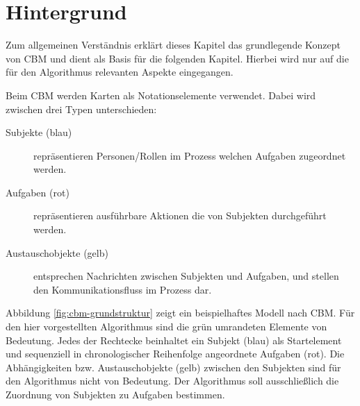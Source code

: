 %
%
% 
% 
% 

\chapter{Hintergrund} %
\label{cha:hintergrund}
Zum allgemeinen Verständnis erklärt dieses Kapitel das grundlegende Konzept von CBM und dient als Basis für die folgenden Kapitel. Hierbei wird nur auf die für den Algorithmus relevanten Aspekte eingegangen. 

Beim CBM werden Karten als Notationselemente verwendet. Dabei wird zwischen drei Typen unterschieden:
\begin{description}
	\item[Subjekte (blau)] repräsentieren Personen/Rollen im Prozess welchen Aufgaben zugeordnet werden.
	\item[Aufgaben (rot)] repräsentieren ausführbare Aktionen die von Subjekten durchgeführt werden.
	\item[Austauschobjekte (gelb)] entsprechen Nachrichten zwischen Subjekten und Aufgaben, und stellen den Kommunikationsfluss im Prozess dar.
\end{description}

Abbildung \ref{fig:cbm-grundstruktur} zeigt ein beispielhaftes Modell nach CBM. Für den hier vorgestellten Algorithmus sind die grün umrandeten Elemente von Bedeutung. Jedes der Rechtecke beinhaltet ein Subjekt (blau) als Startelement und sequenziell in chronologischer Reihenfolge angeordnete Aufgaben (rot). Die Abhängigkeiten bzw. Austauschobjekte (gelb) zwischen den Subjekten sind für den Algorithmus nicht von Bedeutung. Der Algorithmus soll ausschließlich die Zuordnung von Subjekten zu Aufgaben bestimmen.


